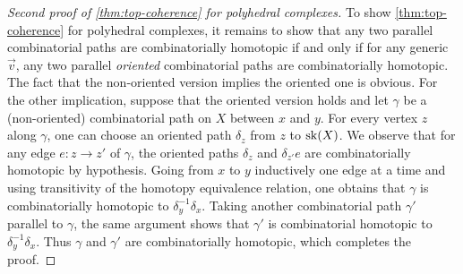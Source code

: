 \begin{proof}[Second proof of {\cref{thm:top-coherence}} for polyhedral complexes]
    To show \cref{thm:top-coherence} for polyhedral complexes, it remains to show that any two parallel combinatorial paths are combinatorially homotopic if and only if for any generic $\vec v$, any two parallel \emph{oriented} combinatorial paths are combinatorially homotopic. 
    The fact that the non-oriented version implies the oriented one is obvious. 
    For the other implication, suppose that the oriented version holds and let $\gamma$ be a (non-oriented) combinatorial path on $X$ between $x$ and $y$.
    For every vertex $z$ along $\gamma$, one can choose an oriented path $\delta_z$ from $z$ to $\mathrm{sk}(X)$. 
    We observe that for any edge $e: z \to z'$ of $\gamma$, the oriented paths $\delta_z$ and $\delta_{z'}e$ are combinatorially homotopic by hypothesis. 
    Going from $x$ to $y$ inductively one edge at a time and using transitivity of the homotopy equivalence relation, one obtains that $\gamma$ is combinatorially homotopic to $\delta_y^{-1}\delta_x$. 
    Taking another combinatorial path $\gamma'$ parallel to $\gamma$, the same argument shows that $\gamma'$ is combinatorial homotopic to $\delta_y^{-1}\delta_x$.
    Thus $\gamma$ and $\gamma'$ are combinatorially homotopic, which completes the proof. 
\end{proof}